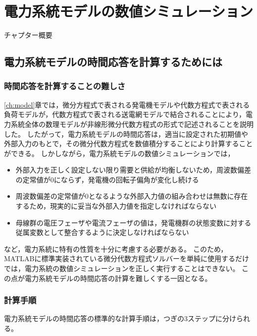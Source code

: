 \documentclass[tombow,dvipdfmx]{corona-a5-1.1}
\begin{document}
\chapter{電力系統モデルの数値シミュレーション}\label{chap:numcal}

チャプター概要

\section{電力系統モデルの時間応答を計算するためには}\label{sec:howtocal}

\subsection{時間応答を計算することの難しさ}

\ref{ch:model}章では，微分方程式で表される発電機モデルや代数方程式で表される負荷モデルが，代数方程式で表される送電網モデルで結合されることにより，電力系統全体の数理モデルが非線形微分代数方程式の形式で記述されることを説明した。
したがって，電力系統モデルの時間応答は，適当に設定された初期値や外部入力のもとで，その微分代数方程式を数値積分することにより計算することができる。
しかしながら，電力系統モデルの数値シミュレーションでは，
\begin{itemize}
\item 外部入力を正しく設定しない限り需要と供給が均衡しないため，周波数偏差の定常値が0にならず，発電機の回転子偏角が変化し続ける
\item 周波数偏差の定常値が0となるような外部入力値の組み合わせは無数に存在するため，現実的に妥当な外部入力値を指定しなければならない
\item 母線群の電圧フェーザや電流フェーザの値は，発電機群の状態変数に対する従属変数として整合するように決定しなければならない
\end{itemize}
など，電力系統に特有の性質を十分に考慮する必要がある。
このため，MATLABに標準実装されている微分代数方程式ソルバーを単純に使用するだけでは，電力系統の数値シミュレーションを正しく実行することはできない。
この点が電力系統モデルの時間応答の計算を難しくする一因となる。

\subsection{計算手順}\label{sec:numstep}

電力系統モデルの時間応答の標準的な計算手順は，つぎの3ステップに分けられる。
\end{document}
